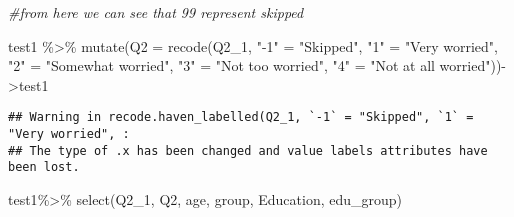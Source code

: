 \documentclass[
]{article}
\newenvironment{Shaded}{\begin{snugshade}}{\end{snugshade}}
\newcommand{\AttributeTok}[1]{\textcolor[rgb]{0.77,0.63,0.00}{#1}}
\newcommand{\CommentTok}[1]{\textcolor[rgb]{0.56,0.35,0.01}{\textit{#1}}}
\newcommand{\FunctionTok}[1]{\textcolor[rgb]{0.00,0.00,0.00}{#1}}
\newcommand{\NormalTok}[1]{#1}
\newcommand{\OtherTok}[1]{\textcolor[rgb]{0.56,0.35,0.01}{#1}}
\newcommand{\SpecialCharTok}[1]{\textcolor[rgb]{0.00,0.00,0.00}{#1}}
\newcommand{\StringTok}[1]{\textcolor[rgb]{0.31,0.60,0.02}{#1}}
\begin{document}
\begin{Shaded}
\begin{Highlighting}[]
\CommentTok{\#from here we can see that 99 represent skipped}
\end{Highlighting}
\end{Shaded}

\begin{Shaded}
\begin{Highlighting}[]
\NormalTok{test1 }\SpecialCharTok{\%\textgreater{}\%}
  \FunctionTok{mutate}\NormalTok{(}\AttributeTok{Q2 =} \FunctionTok{recode}\NormalTok{(Q2\_1, }\StringTok{"{-}1"} \OtherTok{=} \StringTok{"Skipped"}\NormalTok{,}
                     \StringTok{"1"} \OtherTok{=} \StringTok{"Very worried"}\NormalTok{,}
                     \StringTok{"2"} \OtherTok{=} \StringTok{"Somewhat worried"}\NormalTok{,}
                     \StringTok{"3"} \OtherTok{=} \StringTok{"Not too worried"}\NormalTok{,}
                     \StringTok{"4"} \OtherTok{=} \StringTok{"Not at all worried"}\NormalTok{))}\OtherTok{{-}\textgreater{}}\NormalTok{test1}
\end{Highlighting}
\end{Shaded}

\begin{verbatim}
## Warning in recode.haven_labelled(Q2_1, `-1` = "Skipped", `1` = "Very worried", :
## The type of .x has been changed and value labels attributes have been lost.
\end{verbatim}

\begin{Shaded}
\begin{Highlighting}[]
\NormalTok{test1}\SpecialCharTok{\%\textgreater{}\%}
  \FunctionTok{select}\NormalTok{(Q2\_1, Q2, age, group, Education, edu\_group)}
\end{Highlighting}
\end{Shaded}
\end{document}
